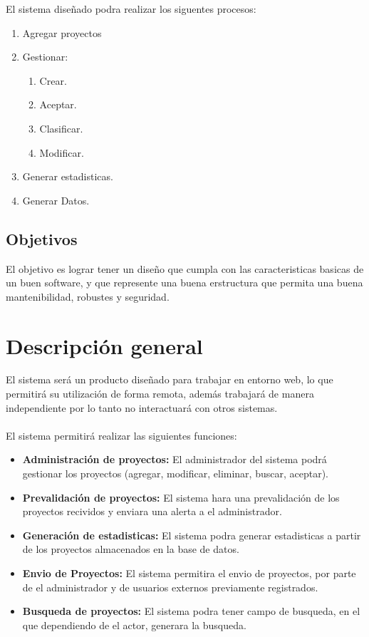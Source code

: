\documentclass[12pt]{article}
\begin{document}
El sistema dise\~nado podra realizar los siguentes procesos:

\begin{enumerate}
\item Agregar proyectos
\item Gestionar:
\begin{enumerate}
\item Crear.
\item Aceptar.
\item Clasificar.
\item Modificar.
\end{enumerate}
\item Generar estadisticas.
\item Generar Datos.
\end{enumerate}

\subsection{Objetivos}
El objetivo es lograr tener un diseño que cumpla con las caracteristicas basicas de un buen software, y que represente una buena erstructura que permita una buena mantenibilidad, robustes y seguridad.

\section{\textbf{Descripci\'on general}}

El sistema será un producto diseñado para trabajar en entorno web, lo que permitirá su utilización de forma remota, además trabajará de manera independiente por lo tanto no interactuará con otros sistemas.\\\\
El sistema permitir\'a realizar las siguientes funciones:\\
\begin{itemize}
\item
\textbf{Administraci\'on de proyectos:} El administrador del sistema podr\'a gestionar los proyectos (agregar, modificar, eliminar, buscar, aceptar).
\item
\textbf{Prevalidaci\'on de proyectos:} El sistema hara una prevalidaci\'on de los proyectos recividos y enviara una alerta a el administrador.
\item
\textbf{Generaci\'on de estadisticas:} El sistema podra generar estadisticas a partir de los proyectos almacenados en la base de datos.
\item
\textbf{Envio de Proyectos:} El sistema permitira el envio de proyectos, por parte de el administrador y de usuarios externos previamente registrados.
\item
\textbf{Busqueda de proyectos:} El sistema podra tener campo de busqueda, en el que dependiendo de el actor, generara la busqueda.

\end{itemize}
\end{document}

